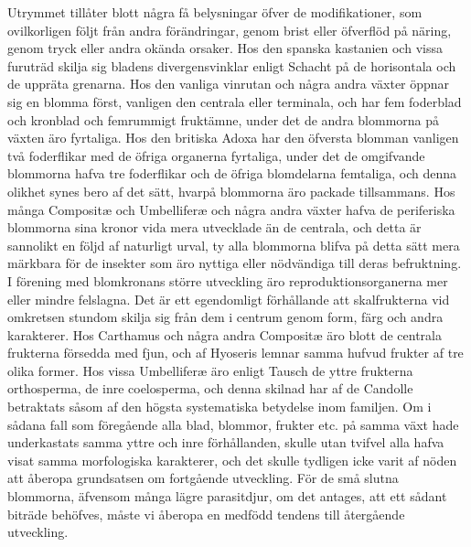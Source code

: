 Utrymmet tillåter blott några få belysningar öfver de modifikationer, som ovilkorligen följt från andra förändringar, genom brist eller öfverflöd på näring, genom tryck eller andra okända orsaker. Hos den spanska kastanien och vissa furuträd skilja sig bladens divergensvinklar enligt Schacht på de horisontala och de uppräta grenarna. Hos den vanliga vinrutan och några andra växter öppnar sig en blomma först, vanligen den centrala eller terminala, och har fem foderblad och kronblad och femrummigt fruktämne, under det de andra blommorna på växten äro fyrtaliga. Hos den britiska Adoxa har den öfversta blomman vanligen två foderflikar med de öfriga organerna fyrtaliga, under det de omgifvande blommorna hafva tre foderflikar och de öfriga blomdelarna femtaliga, och denna olikhet synes bero af det sätt, hvarpå blommorna äro packade tillsammans. Hos många Compositæ och Umbelliferæ och några andra växter hafva de periferiska blommorna sina kronor vida mera utvecklade än de centrala, och detta är sannolikt en följd af naturligt urval, ty alla blommorna blifva på detta sätt mera märkbara för de insekter som äro nyttiga eller nödvändiga till deras befruktning. I förening med blomkronans större utveckling äro reproduktionsorganerna mer eller mindre felslagna. Det är ett egendomligt förhållande att skalfrukterna vid omkretsen stundom skilja sig från dem i centrum genom form, färg och andra karakterer. Hos Carthamus och några andra Compositæ äro blott de centrala frukterna försedda med fjun, och af Hyoseris lemnar samma hufvud frukter af tre olika former. Hos vissa Umbelliferæ äro enligt Tausch de yttre frukterna orthosperma, de inre coelosperma, och denna skilnad har af de Candolle betraktats såsom af den högsta systematiska betydelse inom familjen. Om i sådana fall som föregående alla blad, blommor, frukter etc. på samma växt hade underkastats samma yttre och inre förhållanden, skulle utan tvifvel alla hafva visat samma morfologiska karakterer, och det skulle tydligen icke varit af nöden att åberopa grundsatsen om fortgående utveckling. För de små slutna blommorna, äfvensom många lägre parasitdjur, om det antages, att ett sådant biträde behöfves, måste vi åberopa en medfödd tendens till återgående utveckling.

